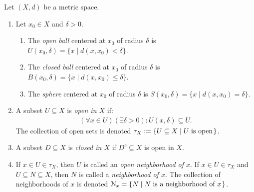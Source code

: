     \begin{definition}\label{def:2.2.2}
        Let $(X,d)$ be a metric space.
            \begin{enumerate}[label = (\arabic*),itemsep=1pt,topsep=3pt]
                \item Let $x_0 \in X$ and $\delta > 0$.
                    \begin{enumerate}[label = (\roman*),itemsep=1pt,topsep=3pt]
                        \item The \textit{open ball} centered at $x_0$ of radius $\delta$ is $U(x_0,\delta) = \{x \mid d(x,x_0) < \delta \}$.
                        \item The \textit{closed ball} centered at $x_0$ of radius $\delta$ is $B(x_0,\delta) = \{x \mid d(x,x_0) \leq \delta \}$.
                        \item The \textit{sphere} centered at $x_0$ of radius $\delta$ is $S(x_0,\delta) = \{x \mid d(x,x_0) = \delta \}$.
                    \end{enumerate}

                \item A subset $U \subseteq X$ is \textit{open in $X$} if:
                    \begin{equation*}
                    \begin{split}
                        (\forall x \in U)(\exists \delta > 0): U(x,\delta) \subseteq U.
                    \end{split}
                    \end{equation*}
                The collection of open sets is denoted $\tau_X :=\{U \subseteq X \mid U \h3\text{is open}\h1\}$.

                \item A subset $D \subseteq X$ is \textit{closed in $X$} if $D^c \subseteq X$ is open in $X$.
                
                \item If $x \in U \in \tau_X$, then $U$ is called an \textit{open neighborhood of $x$}. If $x \in U \in \tau_X$ and $U \subseteq N \subseteq X$, then $N$ is called a \textit{neighborhood of $x$}. The collection of neighborhoods of $x$ is denoted $\cN_x = \{N \mid N \h3 \text{is a neighborhood of $x$}\h1\}$.
                

\end{enumerate}
\end{definition}
